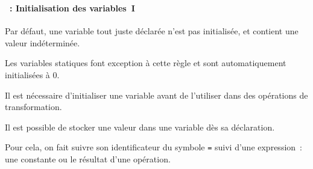\begin{frame}[containsverbatim]
  \frametitle{\secname}
  \framesubtitle{\subsecname~: Initialisation des variables~I}

  Par défaut, une variable tout juste déclarée n'est pas initialisée, et contient une valeur indéterminée.
  \vspace{0.5cm}
  \par
  Les variables statiques font exception à cette règle et sont automatiquement initialisées à 0.
  \vspace{0.5cm}
  \par
  Il est nécessaire d'initialiser une variable avant de l'utiliser dans des opérations de transformation.
  \vspace{0.5cm}
  \par 
  Il est possible de stocker une valeur dans une variable dès sa déclaration. 
  \par
  Pour cela, on fait suivre son identificateur du symbole \verb|=| suivi d'une expression~: une constante ou le résultat d'une opération.
\end{frame}

